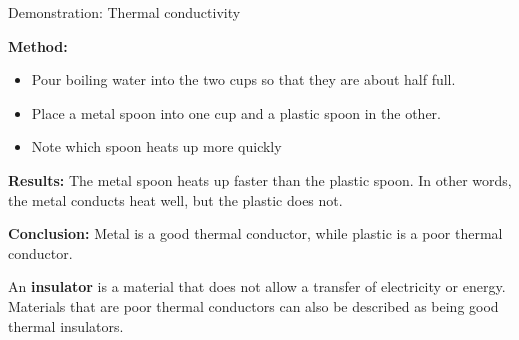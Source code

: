 \begin{g_experiment}{Demonstration: Thermal conductivity}
{\begin{minipage}{.5\textwidth}
\begin{figure}[H]
 \end{figure} 
\end{minipage}
      \label{m38706*id66592}\textbf{Method:}
\label{m38706*id66609}\begin{itemize}[noitemsep]
\label{m38706*uid102}\item Pour boiling water into the two cups so that they are about half full.
\label{m38706*uid103}\item Place a metal spoon into one cup and a plastic spoon in the other.
\label{m38706*uid104}\item Note which spoon heats up more quickly
\end{itemize}
        \par 
\label{m38706*eip-270}
	\par
      \label{m38706*id66666}\noindent{}\textbf{Results: }\newline
    The metal spoon heats up faster than the plastic spoon. In other words, the metal conducts heat well, but the plastic does not.\par 
\label{m38706*id66687}\noindent{}\textbf{Conclusion: }Metal is a good thermal conductor, while plastic is a poor thermal conductor.}
\end{g_experiment}
 \par 
      \label{m38706*id66699}An \textbf{insulator} is a material that does not allow a transfer of electricity or energy. Materials that are poor thermal conductors can also be described as being good thermal insulators.\par 
